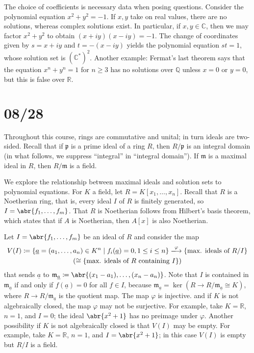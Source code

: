 \documentclass[11pt,leqno]{article}
\theoremstyle{plain}
\theoremstyle{definition}
\numberwithin{equation}{section}
\numberwithin{lem}{section}
\newcommand{\cbr}[1]{\left\{#1\right\}}
\begin{document}
The choice of coefficients is necessary data when posing questions. Consider the polynomial equation $x^2+y^2 = -1$. If $x,y$ take on real values, there are no solutions, whereas complex solutions exist.
In particular, if $x,y\in \mathbb C$, then we may factor $x^2 + y^2$ to obtain $(x+iy)(x-iy) = -1$. The change of coordinates given by $s = x+iy$ and $t = -(x-iy)$ yields the polynomial equation $st = 1$, whose solution set is $(\mathbb C^\ast)^2$.
Another example: Fermat's last theorem says that the equation $x^n + y^n = 1$ for $n\geq 3$ has no solutions over $\mathbb Q$ unless $x = 0$ or $y = 0$, but this is false over $\mathbb R$.

\newpage\section{08/28}
Throughout this course, rings are commutative and unital; in turn ideals are two-sided.
Recall that if $\mathfrak p$ is a prime ideal of a ring $R$, then $R/\mathfrak p$ is an integral domain (in what follows, we suppress ``integral'' in ``integral domain'').
If $\mathfrak m$ is a maximal ideal in $R$, then $R/\mathfrak m$ is a field.

We explore the relationship between maximal ideals and solution sets to polynomial equations.
For $K$ a field, let $R = K[x_1,\dots,x_n]$. Recall that $R$ is a Noetherian ring, that is, every ideal $I$ of $R$ is finitely generated, so $I = \abr{f_1,\dots,f_m}$.
That $R$ is Noetherian follows from Hilbert's basis theorem, which states that if $A$ is Noetherian, then $A[x]$ is also Noetherian.

Let $I = \abr{f_1,\dots,f_m}$ be an ideal of $R$ and consider the map
\begin{multline}
  V(I)\coloneqq\cbr{\underline a = (a_1,\dots,a_n)\in K^n \mid f_i(\underline a) = 0, 1\leq i\leq n}\xlongrightarrow{\varphi}\cbr{\text{max. ideals of }R/I}\\(\cong\cbr{\text{max. ideals of $R$ containing $I$}})
\end{multline}
that sends $\underline a$ to $\mathfrak m_{\underline a} \coloneqq \abr{(x_1-a_1),\dots,(x_n-a_n)}$. Note that $I$ is contained in $\mathfrak m_{\underline a}$ if and only if $f(\underline a) = 0$ for all $f\in I$, because $\mathfrak m_{\underline a} = \ker (R\to R/\mathfrak m_{\underline a}\cong K)$, where $R\to R/\mathfrak m_{\underline a}$ is the quotient map.
The map $\varphi$ is injective. and if $K$ is not algebraically closed, the map $\varphi$ may not be surjective. For example, take $K = \mathbb R$, $n =1$, and $I = 0$; the ideal $\abr{x^2+1}$ has no preimage under $\varphi$. Another possibility if $K$ is not algebraically closed is that $V(I)$ may be empty. For example, take $K = \mathbb R$, $n=1$, and $I= \abr{x^2+1}$; in this case $V(I)$ is empty but $R/I$ is a field.
\end{document}
